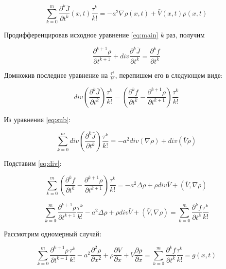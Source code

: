 \begin{equation}\label{eq:sub}
\sum\limits_{k=0}^{m} \dfrac{\partial^k \bar{J}}{\partial t^k}(x,t) \dfrac{\tau^k}{k!} = -a^2 \nabla \rho(x,t) + \bar{V}(x,t) \rho(x,t)
\end{equation}

Продифференцировав исходное уравнение \ref{eq:main} $k$ раз, получим

\begin{equation*}
\dfrac{\partial^{k+1} \rho}{\partial t^{k+1}} + div \dfrac{\partial^k \bar{J}}{\partial t^k} = \dfrac{\partial^k f}{\partial t^k}
\end{equation*}

Домножив последнее уравнение на $\frac{\tau^k}{k!}$, перепишем его в следующем виде:

\begin{equation}\label{eq:div}
div \left( \dfrac{\partial^k \bar{J}}{\partial t^k} \right) \dfrac{\tau^k}{k!} = \left(\dfrac{\partial^k f}{\partial t^k} - \dfrac{\partial^{k+1} \rho}{\partial t^{k+1}} \right) \dfrac{\tau^k}{k!}
\end{equation}

Из уравнения \ref{eq:sub}:

\begin{equation*}
\sum\limits_{k=0}^{m} div \left(\dfrac{\partial^k \bar{J}}{\partial t^k} \right) \dfrac{\tau^k}{k!} = -a^2 div(\nabla \rho) + div(\bar{V} \rho)
\end{equation*}

Подставим \ref{eq:div}:

\begin{equation*}
\sum\limits_{k=0}^{m} \left(\dfrac{\partial^k f}{\partial t^k} - \dfrac{\partial^{k+1} \rho}{\partial t^{k+1}} \right) \dfrac{\tau^k}{k!} = - a^2 \Delta \rho + \rho div\bar{V} + (\bar{V},\nabla \rho)
\end{equation*}

\begin{equation*}
\sum\limits_{k=0}^{m} \dfrac{\partial^{k+1} \rho}{\partial t^{k+1}} \dfrac{\tau^k}{k!} - a^2 \Delta \rho + \rho div\bar{V} + (\bar{V},\nabla \rho) = \sum\limits_{k=0}^{m} \dfrac{\partial^k f}{\partial t^k} \dfrac{\tau^k}{k!}
\end{equation*}

Рассмотрим одномерный случай:

\begin{equation*}
\sum\limits_{k=0}^{m} \dfrac{\partial^{k+1} \rho}{\partial t^{k+1}} \dfrac{\tau^k}{k!} - a^2 \dfrac{\partial^2 \rho}{\partial x^2} + \rho \dfrac{\partial V}{\partial x} + V \dfrac{\partial \rho}{\partial x} = \sum\limits_{k=0}^{m} \dfrac{\partial^k f}{\partial t^k} \dfrac{\tau^k}{k!} = g(x,t)
\end{equation*}

